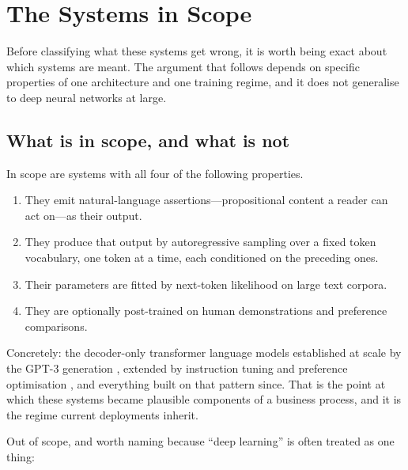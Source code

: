 \section{The Systems in Scope}
\label{sec:architecture}

Before classifying what these systems get wrong, it is worth being exact about
which systems are meant. The argument that follows depends on specific properties
of one architecture and one training regime, and it does not generalise to deep
neural networks at large.

\subsection{What is in scope, and what is not}
\label{sec:scope}

In scope are systems with all four of the following properties.

\begin{enumerate}
  \item They emit natural-language assertions---propositional content a reader can
        act on---as their output.
  \item They produce that output by autoregressive sampling over a fixed token
        vocabulary, one token at a time, each conditioned on the preceding ones.
  \item Their parameters are fitted by next-token likelihood on large text
        corpora.
  \item They are optionally post-trained on human demonstrations and preference
        comparisons.
\end{enumerate}

Concretely: the decoder-only transformer language models established at scale by
the GPT-3 generation \citep{brown2020}, extended by instruction tuning and
preference optimisation \citep{ouyang2022}, and everything built on that pattern
since. That is the point at which these systems became plausible components of a
business process, and it is the regime current deployments inherit.

Out of scope, and worth naming because ``deep learning'' is often treated as one
thing:

